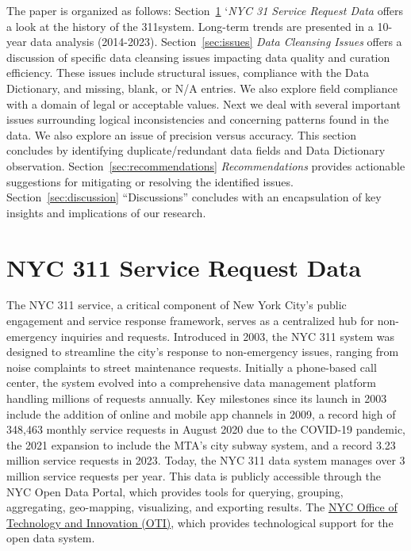 \documentclass[linenumber]{jdsart}
\begin{document}
The paper is organized as follows:
Section~\ref{sec:data} `\textit{NYC 31 Service Request Data} offers a 
look at the history of the 311system. Long-term trends are 
presented in a 10-year data analysis (2014-2023).
Section~\ref{sec:issues} \textit{Data Cleansing Issues} offers a 
discussion of specific data cleansing issues impacting data quality and 
curation efficiency. These issues include structural issues, compliance 
with the Data Dictionary, and missing, blank, or N/A entries. We also
explore field compliance with a domain of legal or acceptable values.
Next we deal with several important issues surrounding logical inconsistencies 
and concerning patterns found in the data. We also explore an issue of precision 
versus accuracy. This section concludes by identifying duplicate/redundant data fields
and Data Dictionary observation. Section~\ref{sec:recommendations} 
\textit{Recommendations} provides actionable suggestions for 
mitigating or resolving the identified issues. Section~\ref{sec:discussion} ``Discussions'' 
concludes with an encapsulation of key insights and implications of our research.


\section{NYC 311 Service Request Data} 
\label{sec:data}
The NYC 311 service, a critical component of New York City's public
engagement and service response framework, serves as a centralized hub
for non-emergency inquiries and requests. Introduced in 2003, the NYC
311 system was designed to streamline the city's response to
non-emergency issues, ranging from noise complaints to street
maintenance requests. Initially a phone-based call center, the system
evolved into a comprehensive data management platform handling
millions of requests annually. Key milestones since its launch in 2003
include the addition of online and mobile app channels in 2009, a
record high of 348,463 monthly service requests in August 2020 due to
the COVID-19 pandemic, the 2021 expansion to include the MTA's city
subway system, and a record 3.23 million service requests in
2023. Today, the NYC 311 data system manages over 3 million service
requests per year. This data is publicly accessible through the NYC Open Data
Portal, which provides tools for querying, grouping, aggregating,
geo-mapping, visualizing, and exporting results. The
\href{https://www.nyc.gov/content/oti/pages/}{NYC Office of Technology
  and Innovation (OTI)}, which provides technological support for the
open data system. 
\end{document}
